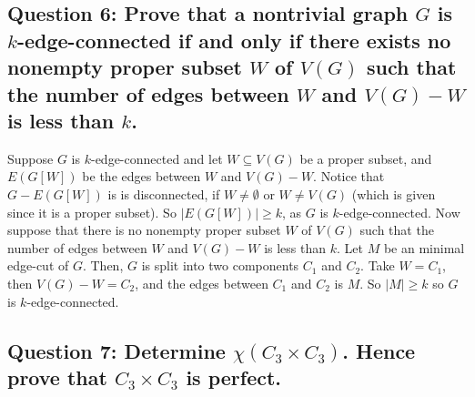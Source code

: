 \documentclass[letterpaper, 11pt]{article}
\newcommand{\1}{\mathds{1}}	%
\theoremstyle{definition}
\begin{document}
\subsection*{Question 6: Prove that a nontrivial graph $G$ is $k$-edge-connected if and only if there exists no
nonempty proper subset $W$ of $V(G)$ such that the number of edges between $W$ and
$V(G) - W$ is less than $k$.}

Suppose $G$ is $k$-edge-connected and let $W \subseteq V(G)$ be a proper subset, and $E(G[W])$ be the edges between $W$ and $V(G) - W$. Notice that $G - E(G[W])$ is is disconnected, if $W \ne \emptyset$ or $W \ne V(G)$ (which is given since it is a proper subset). So $|E(G[W])| \ge k$, as $G$ is $k$-edge-connected. 
Now suppose that there is no nonempty proper subset $W$ of $V(G)$ such that the number of edges between $W$ and $V(G) - W$ is less than $k$. Let $M$ be an minimal edge-cut of $G$. Then, $G$ is split into two components $C_1$ and $C_2$. Take $W = C_1$, then $V(G) - W = C_2$, and the edges between $C_1$ and $C_2$ is $M$. So $|M| \ge k$ so $G$ is $k$-edge-connected.

\subsection*{Question 7: Determine $\chi (C_3 \times C_3)$. Hence prove that $C_3 \times C_3$ is perfect.}
\end{document}
